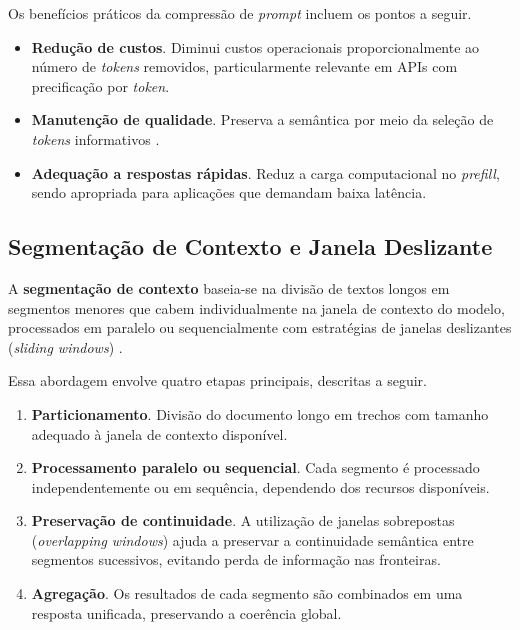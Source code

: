 Os benefícios práticos da compressão de \textit{prompt} incluem os pontos a seguir.

\begin{itemize}[leftmargin=1.6em]
\item \textbf{Redução de custos}. Diminui custos operacionais proporcionalmente ao número de \textit{tokens} removidos, particularmente relevante em APIs com precificação por \textit{token}.

\item \textbf{Manutenção de qualidade}. Preserva a semântica por meio da seleção de \textit{tokens} informativos \cite{jiang2023llmlingua}.

\item \textbf{Adequação a respostas rápidas}. Reduz a carga computacional no \textit{prefill}, sendo apropriada para aplicações que demandam baixa latência.
\end{itemize}

\subsection{Segmentação de Contexto e Janela Deslizante}
\label{subsec:segmentacao}

A \textbf{segmentação de contexto} baseia-se na divisão de textos longos em segmentos menores que cabem individualmente na janela de contexto do modelo, processados em paralelo ou sequencialmente com estratégias de janelas deslizantes (\textit{sliding windows}) \cite{ratner2023parallelwindows}.

Essa abordagem envolve quatro etapas principais, descritas a seguir.

\begin{enumerate}[leftmargin=1.8em]
\item \textbf{Particionamento}. Divisão do documento longo em trechos com tamanho adequado à janela de contexto disponível.

\item \textbf{Processamento paralelo ou sequencial}. Cada segmento é processado independentemente ou em sequência, dependendo dos recursos disponíveis.

\item \textbf{Preservação de continuidade}. A utilização de janelas sobrepostas (\textit{overlapping windows}) ajuda a preservar a continuidade semântica entre segmentos sucessivos, evitando perda de informação nas fronteiras.

\item \textbf{Agregação}. Os resultados de cada segmento são combinados em uma resposta unificada, preservando a coerência global.
\end{enumerate}

